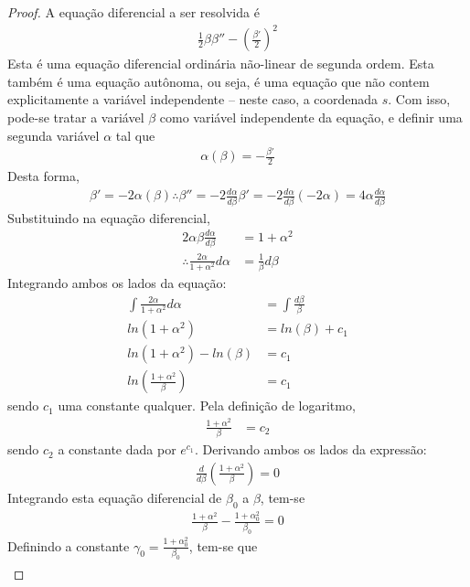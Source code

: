 \begin{proof}
	A equação diferencial a ser resolvida é
	\begin{align*}
		\frac{1}{2}\beta\beta'' - \left(\frac{\beta'}{2}\right)^2
	\end{align*}
	Esta é uma equação diferencial ordinária não-linear de segunda ordem. Esta também é uma equação autônoma, ou seja, é uma equação que não contem explicitamente a variável independente -- neste caso, a coordenada $s$. Com isso, pode-se tratar a variável $\beta$ como variável independente da equação, e definir uma segunda variável $\alpha$ tal que
	\begin{align*}
		\alpha(\beta) = -\frac{\beta'}{2}
	\end{align*}
	Desta forma,
	\begin{align*}
		\beta' = -2\alpha(\beta)
		\therefore \beta'' = -2\frac{d\alpha}{d \beta}\beta' = -2\frac{d\alpha}{d \beta}(-2\alpha) = 4\alpha\frac{d\alpha}{d\beta}
	\end{align*}
	Substituindo na equação diferencial,
	\begin{align*}
		2\alpha\beta\frac{d\alpha}{d\beta} &= 1 + \alpha^2\\
		\therefore \frac{2\alpha}{1+\alpha^2}d\alpha &= \frac{1}{\beta}d\beta
	\end{align*}
	Integrando ambos os lados da equação:
	\begin{align*}
		\int \frac{2\alpha}{1+\alpha^2}d\alpha &= \int \frac{d\beta}{\beta}\\
		ln(1+\alpha^2) &= ln(\beta) + c_1\\
		ln(1+\alpha^2) - ln(\beta) &= c_1\\
		ln\left(\frac{1+\alpha^2}{\beta}\right) &= c_1
	\end{align*}
	sendo $c_1$ uma constante qualquer. Pela definição de logaritmo,
	\begin{align*}
		\frac{1+\alpha^2}{\beta} &= c_2
	\end{align*}
	sendo $c_2$ a constante dada por $e^{c_1}$. Derivando ambos os lados da expressão:
	\begin{align*}
		\frac{d}{d\beta}\left(\frac{1+\alpha^2}{\beta}\right) = 0
	\end{align*}
	Integrando esta equação diferencial de $\beta_0$ a $\beta$, tem-se
	\begin{align*}
		\frac{1+\alpha^2}{\beta} - \frac{1+\alpha_0^2}{\beta_0} = 0
	\end{align*}
	Definindo a constante $\gamma_0 = \frac{1+\alpha_0^2}{\beta_0}$, tem-se que
	\begin{align*}

\end{align*}
\end{proof}
